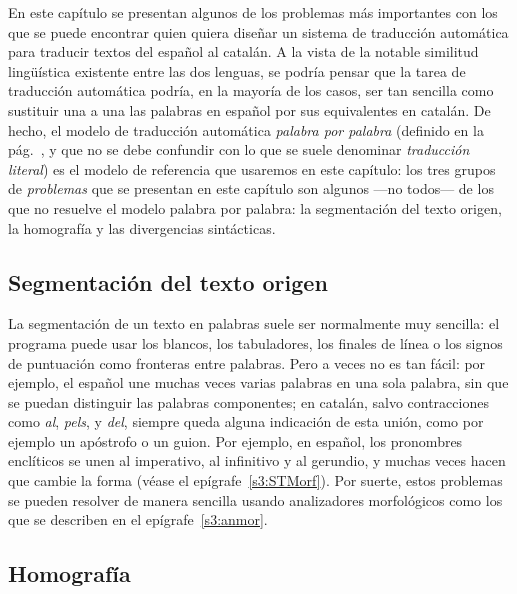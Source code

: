 En este capítulo se presentan algunos de los problemas más importantes con los que se puede encontrar quien quiera diseñar un sistema de traducción automática para traducir textos del español al catalán. A la vista de la notable similitud lingüística existente entre las dos lenguas, se podría pensar que la tarea de traducción automática podría, en la mayoría de los casos, ser tan sencilla como sustituir una a una las palabras en español por sus equivalentes en catalán. De hecho, el modelo de traducción automática \emph{palabra por palabra} (definido en la pág.~\pageref{pg:mpm}, y que no se debe confundir con lo que se suele denominar \emph{traducción literal}) es el modelo de referencia que usaremos en este capítulo: los tres grupos de {\em problemas} que se presentan en este capítulo son algunos ---no todos--- de los que no resuelve el modelo palabra por palabra: la segmentación del texto origen, la homografía y las divergencias sintácticas. 

\subsection{Segmentación del texto origen} 

La segmentación de un texto en palabras suele ser normalmente muy sencilla: el programa puede usar los blancos, los tabuladores, los finales de línea o los signos de puntuación como fronteras entre palabras. Pero a veces no es tan fácil: por ejemplo, el español une muchas veces varias palabras en una sola palabra, sin que se  puedan distinguir las palabras componentes; en catalán, salvo contracciones como \emph{al}, \emph{pels}, y \emph{del}, siempre queda alguna indicación de esta unión, como por ejemplo un apóstrofo o un guion. Por ejemplo, en español, los pronombres enclíticos se unen al imperativo, al infinitivo y al gerundio, y muchas veces hacen que  cambie la forma (véase el epígrafe~\ref{s3:STMorf}). Por suerte, estos problemas se pueden resolver de manera sencilla usando analizadores morfológicos como los que se describen en el epígrafe~\ref{s3:anmor}. 

\subsection{Homografía} 

